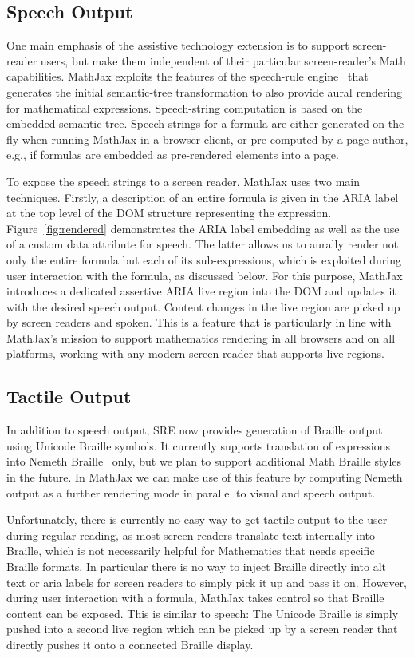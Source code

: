 \documentclass{sig-alternate}
\begin{document}
\subsection{Speech Output}

One main emphasis of the assistive technology extension is to support
screen-reader users, but make them independent of their particular
screen-reader's Math capabilities. MathJax exploits the features of the
speech-rule engine~\cite{Sorge14,SRE} that generates the initial semantic-tree
transformation to also provide aural rendering for mathematical
expressions. Speech-string computation is based on the embedded semantic
tree. Speech strings for a formula are either generated on the fly when running
MathJax in a browser client, or pre-computed by a page author, e.g.,
if formulas are embedded as pre-rendered elements into a page.

To expose the speech strings to a screen reader, MathJax uses two main
techniques.  Firstly, a description of an entire formula is given in the ARIA
label at the top level of the DOM structure representing the expression.
Figure~\ref{fig:rendered} demonstrates the ARIA label embedding as well as the
use of a custom data attribute for speech. The latter allows us to aurally
render not only the entire formula but each of its sub-expressions, which is
exploited during user interaction with the formula, as discussed below.  For
this purpose, MathJax introduces a dedicated assertive ARIA live region into the
DOM and updates it with the desired speech output. Content changes in the live region
are picked up by screen readers and spoken. This is a feature that is
particularly in line with MathJax's mission to support mathematics
rendering in all browsers and on all platforms, working with any modern screen
reader that supports live regions.


\subsection{Tactile Output}

In addition to speech output, SRE now provides generation of Braille
output using Unicode Braille symbols. It currently supports translation of
expressions into Nemeth Braille~\cite{nemeth1972nemeth} only, but we plan to support
additional Math Braille styles in the future. In MathJax we can make use of this
feature by computing Nemeth output as a further rendering mode in parallel to
visual and speech output.

Unfortunately, there is currently no easy way to get tactile output to the user
during regular reading, as most screen readers translate text internally into
Braille, which is not necessarily helpful for Mathematics that needs specific
Braille formats. In particular there is no way to inject Braille directly into
alt text or aria labels for screen readers to simply pick it up and pass it on.
However, during user interaction with a formula, MathJax takes control so that
Braille content can be exposed. This is similar to speech: The Unicode Braille
is simply pushed into a second live region which can be picked up by a screen
reader that directly pushes it onto a connected Braille display.
\end{document}

